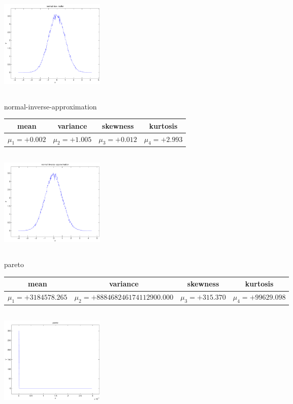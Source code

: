 \documentclass[12pt]{article}
\theoremstyle{definition}
\theoremstyle{remark}
\numberwithin{equation}{section}
\begin{document}
\includegraphics[width=5cm,height=5cm]{normal-box-muller.pdf}

\newpage
normal-inverse-approximation \begin{tabular}{|c|c|c|c|}  mean & variance & skewness & kurtosis \\  \hline
$\mu_1 = +0.002$ & $\mu_2 = +1.005$ & $\mu_3 = +0.012$ & $\mu_4 =+2.993$ \\
\end{tabular}

\includegraphics[width=5cm,height=5cm]{normal-inverse-approximation.pdf}

pareto \begin{tabular}{|c|c|c|c|}  mean & variance & skewness & kurtosis \\  \hline
$\mu_1 = +3184578.265$ & $\mu_2 = +888468246174112900.000$ & $\mu_3 = +315.370$ & $\mu_4 =+99629.098$ \\
\end{tabular}

\includegraphics[width=5cm,height=5cm]{pareto.pdf}
\end{document}
